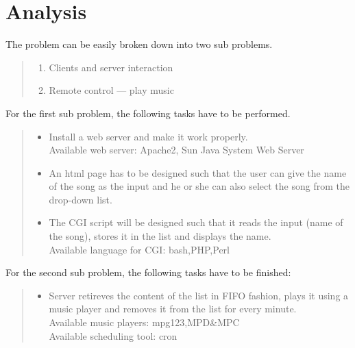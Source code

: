 \section*{Analysis}
The problem can be easily broken down into two sub problems.
\begin{quote}
\begin{enumerate}
\item
Clients and server interaction
\item
Remote control --- play music
\end{enumerate} 
\end{quote}
For the first sub problem, the following tasks have to be performed.
\begin{quote}
\begin{itemize}
\item 
Install a web server and make it work properly. \\
Available web server: Apache2, Sun Java System Web Server
\item
An html page has to be designed such that the user can give the name of the song as the input and he or she can also select the song from the drop-down list.
\item
The CGI script will be designed such that it reads the input (name of the song), stores it in the list and displays the name. \\
Available language for CGI: bash,PHP,Perl
\end{itemize}
\end{quote}
For the second sub problem, the following tasks have to be finished:
\begin{quote}
\begin{itemize}
\item
Server retireves the content of the list in FIFO fashion, plays it using a music player and removes it from the list for every minute. \\
Available music players: mpg123,MPD\&MPC \\
Available scheduling tool: cron \\
\end{itemize}
\end{quote}
